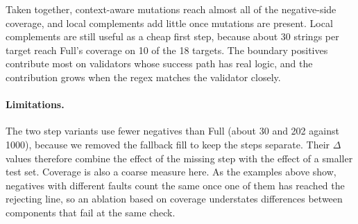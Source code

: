 Taken together, context-aware mutations reach almost all of the negative-side
coverage, and local complements add little once mutations are present. Local
complements are still useful as a cheap first step, because about 30 strings per
target reach Full's coverage on 10 of the 18 targets. The boundary positives
contribute most on validators whose success path has real logic, and the
contribution grows when the regex matches the validator closely.

\paragraph{Limitations.}
The two step variants use fewer negatives than Full (about 30 and 202 against 1000),
because we removed the fallback fill to keep the steps separate. Their $\Delta$
values therefore combine the effect of the missing step with the effect of a
smaller test set. Coverage is also a coarse measure here. As the examples above
show, negatives with different faults count the same once one of them has reached
the rejecting line, so an ablation based on coverage understates differences
between components that fail at the same check.
